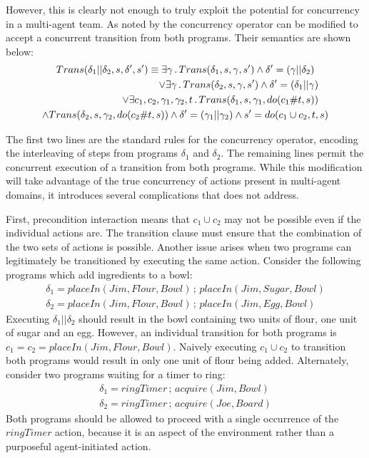 However, this is clearly not enough to truly exploit the potential
for concurrency in a multi-agent team. As noted by \citep{pinto99tcongolog}
the concurrency operator can be modified to accept a concurrent transition
from both programs. Their semantics are shown below:\begin{multline*}
Trans(\delta_{1}||\delta_{2},s,\delta',s')\equiv\exists\gamma\,.\, Trans(\delta_{1},s,\gamma,s')\wedge\delta'=(\gamma||\delta_{2})\\
\shoveright{\vee\exists\gamma\,.\, Trans(\delta_{2},s,\gamma,s')\wedge\delta'=(\delta_{1}||\gamma)}\\
\shoveright{\vee\exists c_{1},c_{2},\gamma_{1},\gamma_{2},t\,.\, Trans(\delta_{1},s,\gamma_{1},do(c_{1}\#t,s))}\\
\wedge Trans(\delta_{2},s,\gamma_{2},do(c_{2}\#t,s))\wedge\delta'=(\gamma_{1}||\gamma_{2})\wedge s'=do(c_{1}\cup c_{2},t,s)\end{multline*}


The first two lines are the standard rules for the concurrency operator,
encoding the interleaving of steps from programs $\delta_{1}$ and
$\delta_{2}$. The remaining lines permit the concurrent execution
of a transition from both programs. While this modification will take
advantage of the true concurrency of actions present in multi-agent
domains, it introduces several complications that \citep{pinto99tcongolog}
does not address.

First, precondition interaction means that $c_{1}\cup c_{2}$ may
not be possible even if the individual actions are. The transition
clause must ensure that the combination of the two sets of actions
is possible. Another issue arises when two programs can legitimately
be transitioned by executing the same action. Consider the following
programs which add ingredients to a bowl:\begin{gather*}
\delta_{1}=placeIn(Jim,Flour,Bowl)\,;\, placeIn(Jim,Sugar,Bowl)\\
\delta_{2}=placeIn(Jim,Flour,Bowl)\,;\, placeIn(Jim,Egg,Bowl)\end{gather*}
 Executing $\delta_{1}||\delta_{2}$ should result in the bowl containing
two units of flour, one unit of sugar and an egg. However, an individual
transition for both programs is $c_{1}=c_{2}=placeIn(Jim,Flour,Bowl)$.
Naively executing $c_{1}\cup c_{2}$ to transition both programs would
result in only one unit of flour being added. Alternately, consider
two programs waiting for a timer to ring:\begin{gather*}
\delta_{1}=ringTimer\,;\, acquire(Jim,Bowl)\\
\delta_{2}=ringTimer\,;\, acquire(Joe,Board)\end{gather*}
 Both programs should be allowed to proceed with a single occurrence
of the $ringTimer$ action, because it is an aspect of the environment
rather than a purposeful agent-initiated action.

